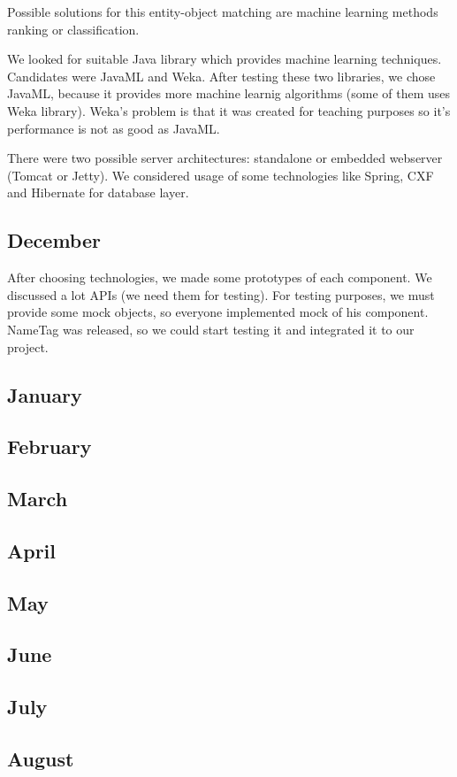 Possible solutions for this entity-object matching are machine learning  methods
ranking or classification.

We looked for suitable Java library which provides machine learning techniques.
Candidates were JavaML and Weka. After testing these two libraries, we chose
JavaML, because it provides more machine learnig algorithms (some of them uses
Weka library). Weka's problem is that it was created for teaching purposes so
it's performance is not as good as JavaML.

There were two possible server architectures: standalone or embedded webserver
(Tomcat or Jetty). We considered usage of some technologies like Spring, CXF and
Hibernate for database layer.

\subsection{December}
After choosing technologies, we made some prototypes of each component. We
discussed a lot APIs (we need them for testing). For testing purposes, we must
provide some mock objects, so everyone implemented mock of his component.
NameTag was released, so we could start testing it and integrated it to our
project.

\subsection{January}
\subsection{February}
\subsection{March}
\subsection{April}
\subsection{May}
\subsection{June}
\subsection{July}
\subsection{August}